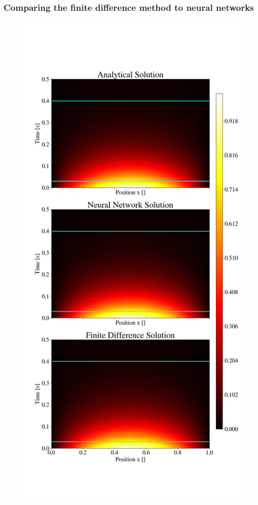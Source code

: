 \subsubsection{Comparing the finite difference method to neural networks}
\begin{figure}[h!]
    \centering
    \includegraphics[width=1.0\linewidth]{project_3/plots/heat_map_comparison.png}

\end{figure}
